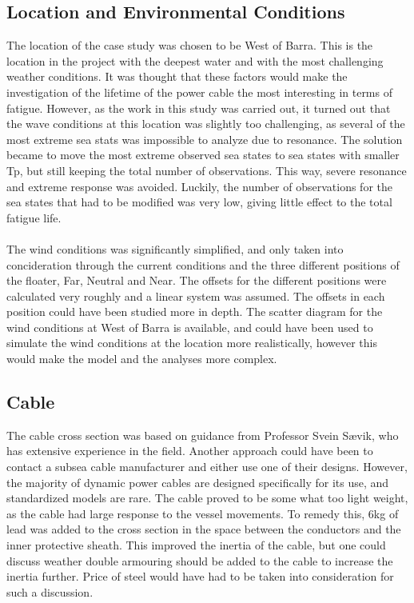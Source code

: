 \subsection{Location and Environmental Conditions}
The location of the case study was chosen to be West of Barra. This is the location in the project with the deepest water and with the most challenging weather conditions. It was thought that these factors would make the investigation of the lifetime of the power cable the most interesting in terms of fatigue. However, as the work in this study was carried out, it turned out that the wave conditions at this location was slightly too challenging, as several of the most extreme sea stats was impossible to analyze due to resonance. The solution became to move the most extreme observed sea states to sea states with smaller Tp, but still keeping the total number of observations. This way, severe resonance and extreme response was avoided. Luckily, the number of observations for the sea states that had to be modified was very low, giving little effect to the total fatigue life.\\\\
The wind conditions was significantly simplified, and only taken into concideration through the current conditions and the three different positions of the floater, Far, Neutral and Near. The offsets for the different positions were calculated very roughly and a linear system was assumed. The offsets in each position could have been studied more in depth. The scatter diagram for the wind conditions at West of Barra is available, and could have been used to simulate the wind conditions at the location more realistically, however this would make the model and the analyses more complex.


\subsection{Cable}
\label{sec:disccable}
The cable cross section was based on guidance from Professor Svein Sævik, who has extensive experience in the field. Another approach could have been to contact a subsea cable manufacturer and either use one of their designs.  However, the majority of dynamic power cables are designed specifically for its use, and standardized models are rare. The cable proved to be some what too light weight, as the cable had large response to the vessel movements. To remedy this, 6kg of lead was added to the cross section in the space between the conductors and the inner protective sheath. This improved the inertia of the cable, but one could discuss weather double armouring should be added to the cable to increase the inertia further. Price of steel would have had to be taken into consideration for such a discussion.
